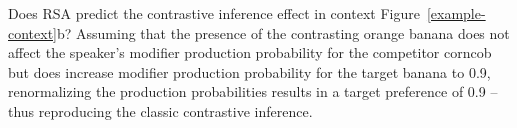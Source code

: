 \documentclass[10pt,letterpaper]{article}
\newcommand{\ek}[1]{\textcolor{Orange}{[ek: #1]}}
\newcommand{\jd}[1]{\textcolor{Purple}{[jd: #1]}}
\begin{document}

Does RSA predict the contrastive inference effect in context Figure~\ref{example-context}b? Assuming that the presence of the contrasting orange banana does not affect the speaker's modifier production probability for the competitor corncob but does increase modifier production probability for the target banana to 0.9,  renormalizing the production probabilities results in a target preference of 0.9 -- thus reproducing the classic contrastive inference.%
\end{document}
